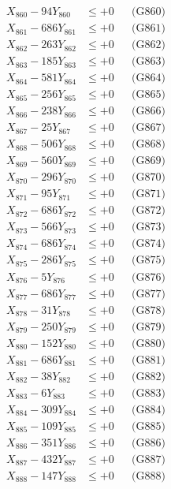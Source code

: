 \documentclass[a4paper,10pt]{article}
\begin{document}
{\begin{align}
X_{860} - 94Y_{860} &\leq +0 && \text{(G860)} \\
\allowbreak
X_{861} - 686Y_{861} &\leq +0 && \text{(G861)} \\
X_{862} - 263Y_{862} &\leq +0 && \text{(G862)} \\
X_{863} - 185Y_{863} &\leq +0 && \text{(G863)} \\
X_{864} - 581Y_{864} &\leq +0 && \text{(G864)} \\
X_{865} - 256Y_{865} &\leq +0 && \text{(G865)} \\
X_{866} - 238Y_{866} &\leq +0 && \text{(G866)} \\
X_{867} - 25Y_{867} &\leq +0 && \text{(G867)} \\
X_{868} - 506Y_{868} &\leq +0 && \text{(G868)} \\
X_{869} - 560Y_{869} &\leq +0 && \text{(G869)} \\
X_{870} - 296Y_{870} &\leq +0 && \text{(G870)} \\
\allowbreak
X_{871} - 95Y_{871} &\leq +0 && \text{(G871)} \\
X_{872} - 686Y_{872} &\leq +0 && \text{(G872)} \\
X_{873} - 566Y_{873} &\leq +0 && \text{(G873)} \\
X_{874} - 686Y_{874} &\leq +0 && \text{(G874)} \\
X_{875} - 286Y_{875} &\leq +0 && \text{(G875)} \\
X_{876} - 5Y_{876} &\leq +0 && \text{(G876)} \\
X_{877} - 686Y_{877} &\leq +0 && \text{(G877)} \\
X_{878} - 31Y_{878} &\leq +0 && \text{(G878)} \\
X_{879} - 250Y_{879} &\leq +0 && \text{(G879)} \\
X_{880} - 152Y_{880} &\leq +0 && \text{(G880)} \\
\allowbreak
X_{881} - 686Y_{881} &\leq +0 && \text{(G881)} \\
X_{882} - 38Y_{882} &\leq +0 && \text{(G882)} \\
X_{883} - 6Y_{883} &\leq +0 && \text{(G883)} \\
X_{884} - 309Y_{884} &\leq +0 && \text{(G884)} \\
X_{885} - 109Y_{885} &\leq +0 && \text{(G885)} \\
X_{886} - 351Y_{886} &\leq +0 && \text{(G886)} \\
X_{887} - 432Y_{887} &\leq +0 && \text{(G887)} \\
X_{888} - 147Y_{888} &\leq +0 && \text{(G888)} \\

\end{align}}
\end{document}
